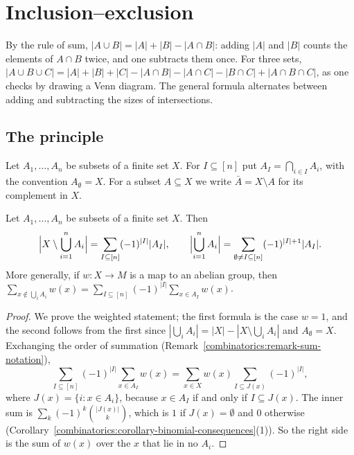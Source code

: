 \section{Inclusion--exclusion}\label{combinatorics:section-inclusion-exclusion}

By the rule of sum, $|A \cup B| = |A| + |B| - |A \cap B|$: adding $|A|$ and $|B|$ counts the elements of $A \cap B$ twice, and one subtracts them once. For three sets,
$|A \cup B \cup C| = |A| + |B| + |C| - |A \cap B| - |A \cap C| - |B \cap C| + |A \cap B \cap C|$, as one checks by drawing a Venn diagram. The general formula alternates between adding and subtracting
the sizes of intersections.

\subsection{The principle}\label{combinatorics:subsection-inclusion-exclusion}

\begin{notation}\label{combinatorics:notation-intersections}
Let $A_1, \ldots, A_n$ be subsets of a finite set $X$. For $I \subseteq [n]$ put $A_I = \bigcap_{i \in I}A_i$, with the convention $A_\emptyset = X$. For a subset $A \subseteq X$ we write
$\bar{A} = X \setminus A$ for its complement in $X$.
\end{notation}

\begin{theorem}\label{combinatorics:theorem-inclusion-exclusion}
Let $A_1, \ldots, A_n$ be subsets of a finite set $X$. Then
\[
\Bigl|X \setminus \bigcup_{i=1}^{n}A_i\Bigr| = \sum_{I \subseteq [n]}(-1)^{|I|}|A_I|, \qquad \Bigl|\bigcup_{i=1}^{n}A_i\Bigr| = \sum_{\emptyset \neq I \subseteq [n]}(-1)^{|I|+1}|A_I|.
\]
More generally, if $w \colon X \to M$ is a map to an abelian group, then $\sum_{x \notin \bigcup_iA_i}w(x) = \sum_{I \subseteq [n]}(-1)^{|I|}\sum_{x \in A_I}w(x)$.
\end{theorem}

\begin{proof}
We prove the weighted statement; the first formula is the case $w = 1$, and the second follows from the first since $|\bigcup_iA_i| = |X| - |X \setminus \bigcup_iA_i|$ and $A_\emptyset = X$.
Exchanging the order of summation (Remark~\ref{combinatorics:remark-sum-notation}),
\[
\sum_{I \subseteq [n]}(-1)^{|I|}\sum_{x \in A_I}w(x) = \sum_{x \in X}w(x)\sum_{I \subseteq J(x)}(-1)^{|I|},
\]
where $J(x) = \{i : x \in A_i\}$, because $x \in A_I$ if and only if $I \subseteq J(x)$. The inner sum is $\sum_{k}(-1)^k\binom{|J(x)|}{k}$, which is $1$ if $J(x) = \emptyset$ and $0$ otherwise
(Corollary~\ref{combinatorics:corollary-binomial-consequences}(1)). So the right side is the sum of $w(x)$ over the $x$ that lie in no $A_i$.
\end{proof}

